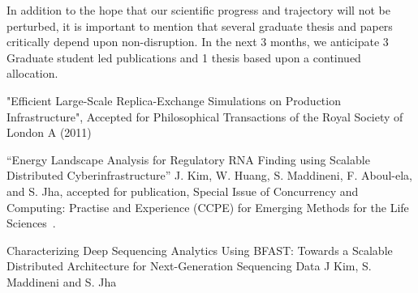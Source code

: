 \documentclass[a4paper,10pt]{article}
\begin{document}
In addition to the hope that our scientific progress and trajectory will not be perturbed, it is important to mention that several graduate thesis and papers critically depend upon non-disruption. In the next 3 months, we anticipate 3 Graduate student led publications and 1 thesis based upon a continued allocation.


\begin{thebibliography}{9}


 "Efficient Large-Scale Replica-Exchange Simulations on Production Infrastructure", Accepted for Philosophical Transactions of the Royal Society of London A (2011)

 ``Energy Landscape Analysis for Regulatory RNA
  Finding using Scalable Distributed Cyberinfrastructure'' J. Kim,
  W. Huang, S. Maddineni, F. Aboul-ela, and S. Jha, accepted for
  publication, Special Issue of Concurrency and Computing: Practise
  and Experience (CCPE) for Emerging Methods for the Life
  Sciences~\cite{eclms10}.

 Characterizing Deep Sequencing Analytics Using
  BFAST: Towards a Scalable Distributed Architecture for
  Next-Generation Sequencing Data J Kim, S. Maddineni and S. Jha

\end{thebibliography}
\end{document}
